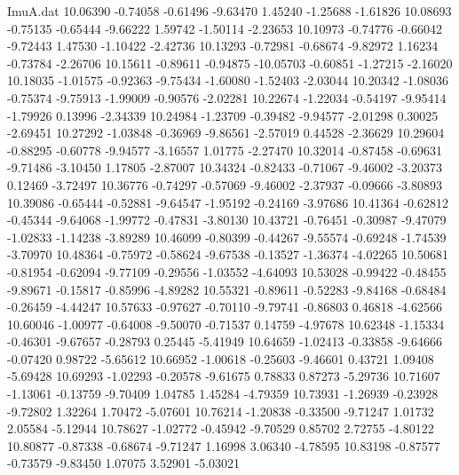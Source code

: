 \begin{filecontents}{ImuA.dat}
  10.06390   -0.74058   -0.61496   -9.63470    1.45240   -1.25688   -1.61826
  10.08693   -0.75135   -0.65444   -9.66222    1.59742   -1.50114   -2.23653
  10.10973   -0.74776   -0.66042   -9.72443    1.47530   -1.10422   -2.42736
  10.13293   -0.72981   -0.68674   -9.82972    1.16234   -0.73784   -2.26706
  10.15611   -0.89611   -0.94875  -10.05703   -0.60851   -1.27215   -2.16020
  10.18035   -1.01575   -0.92363   -9.75434   -1.60080   -1.52403   -2.03044
  10.20342   -1.08036   -0.75374   -9.75913   -1.99009   -0.90576   -2.02281
  10.22674   -1.22034   -0.54197   -9.95414   -1.79926    0.13996   -2.34339
  10.24984   -1.23709   -0.39482   -9.94577   -2.01298    0.30025   -2.69451
  10.27292   -1.03848   -0.36969   -9.86561   -2.57019    0.44528   -2.36629
  10.29604   -0.88295   -0.60778   -9.94577   -3.16557    1.01775   -2.27470
  10.32014   -0.87458   -0.69631   -9.71486   -3.10450    1.17805   -2.87007
  10.34324   -0.82433   -0.71067   -9.46002   -3.20373    0.12469   -3.72497
  10.36776   -0.74297   -0.57069   -9.46002   -2.37937   -0.09666   -3.80893
  10.39086   -0.65444   -0.52881   -9.64547   -1.95192   -0.24169   -3.97686
  10.41364   -0.62812   -0.45344   -9.64068   -1.99772   -0.47831   -3.80130
  10.43721   -0.76451   -0.30987   -9.47079   -1.02833   -1.14238   -3.89289
  10.46099   -0.80399   -0.44267   -9.55574   -0.69248   -1.74539   -3.70970
  10.48364   -0.75972   -0.58624   -9.67538   -0.13527   -1.36374   -4.02265
  10.50681   -0.81954   -0.62094   -9.77109   -0.29556   -1.03552   -4.64093
  10.53028   -0.99422   -0.48455   -9.89671   -0.15817   -0.85996   -4.89282
  10.55321   -0.89611   -0.52283   -9.84168   -0.68484   -0.26459   -4.44247
  10.57633   -0.97627   -0.70110   -9.79741   -0.86803    0.46818   -4.62566
  10.60046   -1.00977   -0.64008   -9.50070   -0.71537    0.14759   -4.97678
  10.62348   -1.15334   -0.46301   -9.67657   -0.28793    0.25445   -5.41949
  10.64659   -1.02413   -0.33858   -9.64666   -0.07420    0.98722   -5.65612
  10.66952   -1.00618   -0.25603   -9.46601    0.43721    1.09408   -5.69428
  10.69293   -1.02293   -0.20578   -9.61675    0.78833    0.87273   -5.29736
  10.71607   -1.13061   -0.13759   -9.70409    1.04785    1.45284   -4.79359
  10.73931   -1.26939   -0.23928   -9.72802    1.32264    1.70472   -5.07601
  10.76214   -1.20838   -0.33500   -9.71247    1.01732    2.05584   -5.12944
  10.78627   -1.02772   -0.45942   -9.70529    0.85702    2.72755   -4.80122
  10.80877   -0.87338   -0.68674   -9.71247    1.16998    3.06340   -4.78595
  10.83198   -0.87577   -0.73579   -9.83450    1.07075    3.52901   -5.03021

\end{filecontents}
